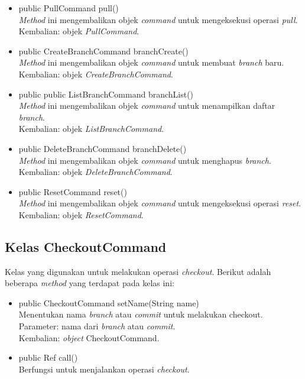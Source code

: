 \begin{itemize}
\item public PullCommand pull()\\
\textit{Method} ini mengembalikan objek \textit{command} untuk mengeksekusi operasi \textit{pull}.\\
Kembalian: objek \textit{PullCommand}.

\item public CreateBranchCommand branchCreate()\\
\textit{Method} ini mengembalikan objek \textit{command} untuk membuat \textit{branch} baru.\\
Kembalian: objek \textit{CreateBranchCommand}.

\item public public ListBranchCommand branchList()\\
\textit{Method} ini mengembalikan objek \textit{command} untuk menampilkan daftar \textit{branch}.\\
Kembalian: objek \textit{ListBranchCommand}.

\item public DeleteBranchCommand branchDelete()\\
\textit{Method} ini mengembalikan objek \textit{command} untuk menghapus \textit{branch}.\\
Kembalian: objek \textit{DeleteBranchCommand}.

\item public ResetCommand reset()\\
\textit{Method} ini mengembalikan objek \textit{command} untuk mengeksekusi operasi \textit{reset}.\\
Kembalian: objek \textit{ResetCommand}.
\end{itemize}

\subsection{Kelas CheckoutCommand}
\label{subsec:checkoutcommand}
Kelas yang digunakan untuk melakukan operasi \textit{checkout}.
Berikut adalah beberapa \textit{method} yang terdapat pada kelas ini:
\begin{itemize}
\item public CheckoutCommand setName(String name)\\
Menentukan nama  \textit{branch} atau \textit{commit} untuk melakukan checkout.\\
Parameter: nama dari \textit{branch} atau \textit{commit}.\\
Kembalian: \textit{object} CheckoutCommand.
\item public Ref call()\\
Berfungsi untuk menjalankan operasi \textit{checkout}.
\end{itemize}

